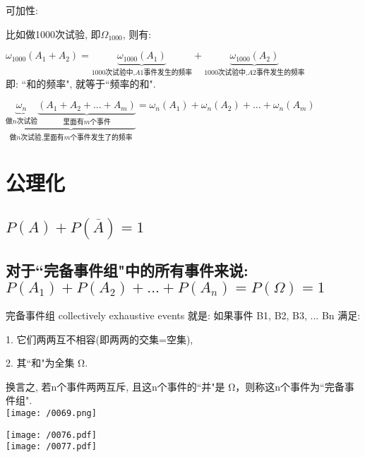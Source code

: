 \documentclass[UTF8]{ctexart}
\begin{document}
可加性: 


比如做1000次试验, 即$ \varOmega_{1000}$, 则有: 

$\omega _{1000}\left( A_1+A_2 \right) =\underset{1000\text{次试验中,}A1\text{事件发生的频率}}{\underbrace{\omega _{1000}\left( A_1 \right) }}+\underset{1000\text{次试验中,}A2\text{事件发生的频率}}{\underbrace{\omega _{1000}\left( A_2 \right) }}$ \\

即: ``和的频率", 就等于``频率的和".

$
\boxed{
\underset{\text{做}n\text{次试验,里面有}m\text{个事件发生了的频率}}{\underbrace{\underset{\text{做}n\text{次试验}}{\underbrace{\omega _n}}\underset{\text{里面有}m\text{个事件}}{\underbrace{\left( A_1+A_2+...+A_m \right) }}}}=\omega _n\left( A_1 \right) +\omega _n\left( A_2 \right) +...+\omega _n\left( A_m \right) 
}
$



	
\section{公理化}
	
	\subsection{$P(A) + P(\overline{A}) = 1$}
	
	\subsection{对于``完备事件组"中的所有事件来说: $P(A_1) + P(A_2) + ... +  P(A_n) =  P(\Omega) = 1$}
	
	完备事件组 collectively exhaustive events 就是: 如果事件 B1, B2, B3, ...  Bn 满足:
	
	1. 它们两两互不相容(即两两的交集=空集),
	
	2. 其``和"为全集 Ω. 	
	
	换言之, 若n个事件两两互斥, 且这n个事件的``并"是 Ω，则称这n个事件为``完备事件组". \\
	
	\texttt{[image: /0069.png]}
	
	
	\begin{myEnvSample}
\texttt{[image: /0076.pdf]} \\

\texttt{[image: /0077.pdf]}
	\end{myEnvSample}
	
\end{document}
